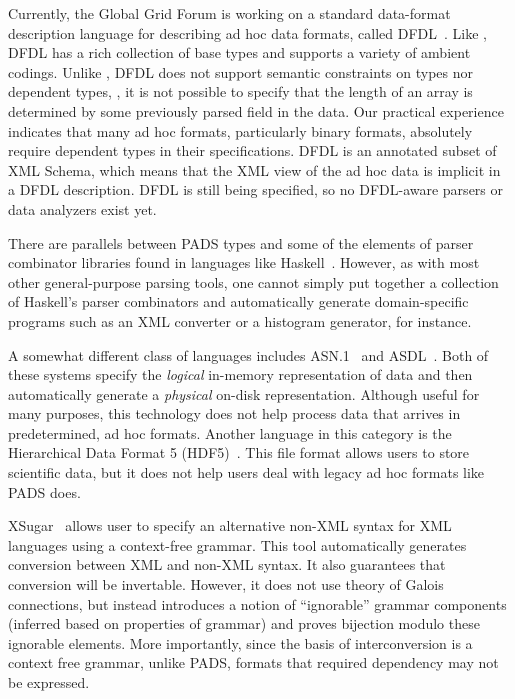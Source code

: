 \documentclass[11pt]{article}
\begin{document}
Currently, the Global Grid Forum is working on a standard
data-format description language for describing ad hoc data formats,
called DFDL~\cite{dfdl-proposal,dfdl-primer}.  Like \pads{},
DFDL{} has a rich collection of base types and supports a variety of
ambient codings.  Unlike \pads{}, DFDL{} does not support semantic
constraints on types nor dependent types, \eg{}, it is not possible to
specify that the length of an array is determined by some previously parsed field in the
data.  Our practical experience indicates that many ad hoc formats,
particularly binary formats, absolutely require dependent types in their
specifications.  DFDL{} is an annotated subset of XML{} Schema, which means
that the XML{} view of the ad hoc data is implicit in a DFDL{}
description.  DFDL{} is still being specified, so no DFDL-aware
parsers or data analyzers exist yet.  

There are parallels between PADS types and some of the elements of parser
combinator libraries found in languages like
Haskell~\cite{burge:parser-combinators,hutton+:parser-combinators}. 
However, as with most other general-purpose parsing tools, one cannot
simply put together a collection of Haskell's parser combinators and
automatically generate domain-specific programs such as 
an XML converter or a histogram generator, for instance.  

A somewhat different class of languages includes
\textsc{ASN.1}~\cite{asn} and \textsc{ASDL}~\cite{asdl}.  Both of
these systems specify the {\em logical\/} in-memory representation of
data and then automatically generate a {\em physical\/} on-disk
representation.  Although useful for many purposes, this technology
does not help process data that arrives in predetermined, ad hoc
formats.  Another language in this category is the Hierarchical Data
Format 5 (HDF5)~\cite{hdf5}.  This file format allows users to store
scientific data, but it does not help users deal with legacy ad hoc
formats like PADS does.


XSugar~\cite{brabrand+:xsugar2005} allows user to specify an
alternative non-XML syntax for XML languages using a context-free
grammar.  This tool automatically generates conversion between XML and
non-XML syntax. It also guarantees that conversion will be invertable.
However, it does not use theory of Galois connections, but instead
introduces a notion of ``ignorable'' grammar components (inferred
based on properties of grammar) and proves bijection modulo these
ignorable elements.  More importantly, since the basis of
interconversion is a context free grammar, unlike PADS, formats that
required dependency may not be expressed.
\end{document}
